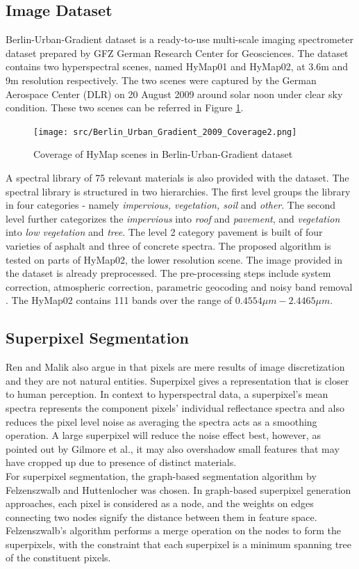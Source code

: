 \documentclass[12pt,twoside]{article}
\theoremstyle{plain}
\theoremstyle{definition}
\theoremstyle{remark}
\begin{document}
\subsection{Image Dataset}
Berlin-Urban-Gradient dataset \cite{okujeni2016berlinurbangradient} is a ready-to-use multi-scale imaging spectrometer dataset prepared by GFZ German Research Center for Geosciences. The dataset contains two hyperspectral scenes, named HyMap01 and HyMap02, at 3.6m and 9m resolution respectively. The two scenes were captured by the German Aerospace Center (DLR) on 20 August 2009 around solar noon under clear sky condition. These two scenes can be referred in Figure \ref{fig:data}.\\
\begin{figure}
\texttt{[image: src/Berlin\_Urban\_Gradient\_2009\_Coverage2.png]}
\caption{Coverage of HyMap scenes in Berlin-Urban-Gradient dataset \cite{okujeni2016berlinurbangradient}}
\label{fig:data}
\end{figure}
A spectral library of 75 relevant materials is also provided with the dataset. The spectral library is structured in two hierarchies. The first level groups the library in four categories - namely \textit{impervious, vegetation, soil} and \textit{other}. The second level further categorizes the \textit{impervious} into \textit{roof} and \textit{pavement}, and \textit{vegetation} into \textit{low vegetation} and \textit{tree}. The level 2 category pavement is built of four varieties of asphalt and three of concrete spectra. The proposed algorithm is tested on parts of HyMap02, the lower resolution scene. The image provided in the dataset is already preprocessed. The pre-processing steps include system correction, atmospheric correction, parametric geocoding and noisy band removal \cite{okujeni2016berlinurbangradient}. The HyMap02 contains 111 bands over the range of $0.4554\mu m - 2.4465\mu m$.

\subsection{Superpixel Segmentation}
Ren and Malik also argue in \cite{ren2003learning} that pixels are mere results of image discretization and they are not natural entities. Superpixel gives a representation that is closer to human perception. In context to hyperspectral data, a superpixel's mean spectra represents the component pixels' individual reflectance spectra and also reduces the pixel level noise as averaging the spectra acts as a smoothing operation. A large superpixel will reduce the noise effect best, however, as pointed out by Gilmore et al.\cite{gilmore2011superpixel}, it may also overshadow small features that may have cropped up due to presence of distinct materials.\\
For superpixel segmentation, the graph-based segmentation algorithm by Felzenszwalb and Huttenlocher \cite{felzenszwalb2004efficient} was chosen. In graph-based superpixel generation approaches, each pixel is considered as a node, and the weights on edges connecting two nodes signify the distance between them in feature space. Felzenszwalb's algorithm performs a merge operation on the nodes to form the superpixels, with the constraint that each superpixel is a minimum spanning tree of the constituent pixels.
\end{document}
